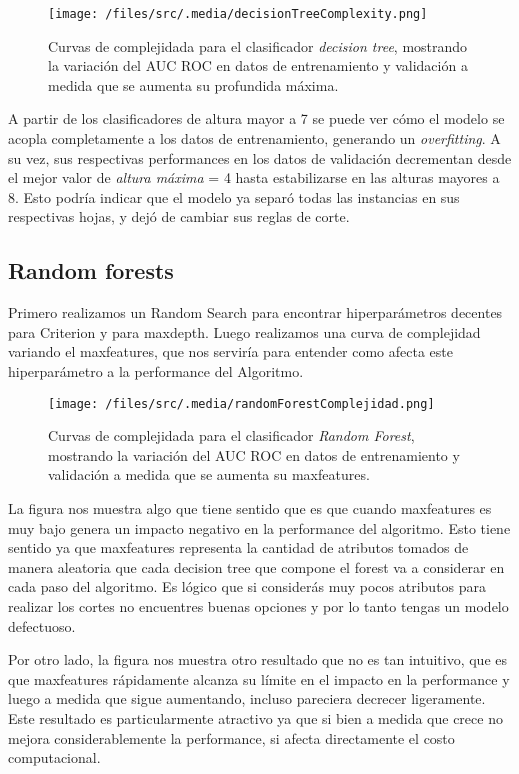 \begin{figure}[!htbp] 
    \centering
    \texttt{[image: /files/src/.media/decisionTreeComplexity.png]}
    \caption{Curvas de complejidada para el clasificador \textit{decision tree}, mostrando la variación del AUC ROC en datos de entrenamiento y validación a medida que se aumenta su profundida máxima.}
    \label{SVMComplexity}
\end{figure}

A partir de los clasificadores de altura mayor a 7 se puede ver cómo el modelo se  acopla completamente a los datos de entrenamiento, generando un \textit{overfitting}. A su vez, sus respectivas performances en los datos de validación decrementan desde el mejor valor de \textit{altura máxima} = 4 hasta estabilizarse en las alturas mayores a 8. Esto podría indicar que el modelo ya separó todas las instancias en sus respectivas hojas, y dejó de cambiar sus reglas de corte. 
 
\subsection{Random forests}

Primero realizamos un Random Search para encontrar hiperparámetros decentes para Criterion y para maxdepth. Luego realizamos una curva de complejidad variando el maxfeatures, que nos serviría para entender como afecta este hiperparámetro a la performance del Algoritmo. 

\begin{figure}[!htbp]
    \centering
    \texttt{[image: /files/src/.media/randomForestComplejidad.png]}
    \caption{Curvas de complejidada para el clasificador \textit{Random Forest}, mostrando la variación del AUC ROC en datos de entrenamiento y validación a medida que se aumenta su maxfeatures.}
    \label{RFComplexity}
\end{figure}



La figura nos muestra algo que tiene sentido que es que cuando maxfeatures es muy bajo genera un impacto negativo en la performance del algoritmo. Esto tiene sentido ya que maxfeatures representa la cantidad de atributos tomados de manera aleatoria que cada decision tree que compone el forest va a considerar en cada paso del algoritmo. Es lógico que si considerás muy pocos atributos para realizar los cortes no encuentres buenas opciones y por lo tanto tengas un modelo defectuoso.

Por otro lado, la figura nos muestra otro resultado que no es tan intuitivo, que es que maxfeatures rápidamente alcanza su límite en el impacto en la performance y luego a medida que sigue aumentando, incluso pareciera decrecer ligeramente. Este resultado es particularmente atractivo ya que si bien a medida que crece no mejora considerablemente la performance, si afecta directamente el costo computacional. 


